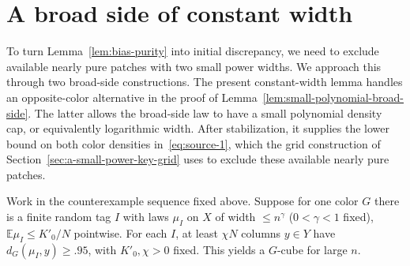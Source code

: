 \section{A broad side of constant width}
\label{sec:a-constant-broad-high-neighborhood-case}

To turn Lemma~\ref{lem:bias-purity} into initial discrepancy, we need to
exclude available nearly pure patches with two small power widths. We
approach this through two broad-side constructions. The present
constant-width lemma handles an opposite-color alternative in the proof
of Lemma~\ref{lem:small-polynomial-broad-side}. The latter allows the
broad-side law to have a small polynomial density cap, or equivalently
logarithmic width. After stabilization, it supplies the lower bound on
both color densities in~\eqref{eq:source-1}, which the grid construction
of Section~\ref{sec:a-small-power-key-grid} uses to exclude these available
nearly pure patches.

\begin{lemma}
\label{lem:constant-broad-high-neighborhood}
Work in the counterexample sequence fixed above. Suppose for one color \(G\) there is a finite random tag \(I\) with laws \(\mu_I\) on \(X\) of width \(\le n^\gamma\) (\(0<\gamma<1\) fixed), \(\mathbb E\mu_I\le K'_0/N\) pointwise. For each \(I\), at least \(\chi N\) columns \(y\in Y\) have \(d_G(\mu_I,y)\ge .95\), with \(K'_0,\chi>0\) fixed. This yields a \(G\)-cube for large \(n\).
\end{lemma}

